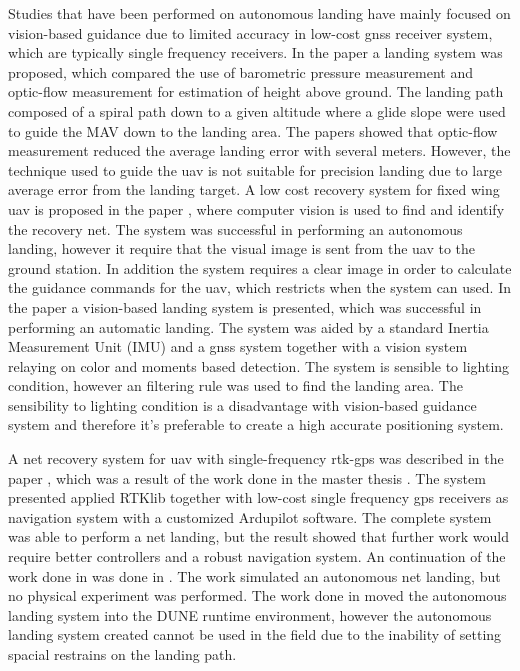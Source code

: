 Studies that have been performed on autonomous landing have mainly focused on vision-based guidance due to limited accuracy in low-cost \gls{gnss} receiver system, which are typically single frequency receivers. In the paper \citep{barber2007autonomous} a landing system was proposed, which compared the use of barometric pressure measurement and optic-flow measurement for estimation of height above ground. The landing path composed of a spiral path down to a given altitude where a glide slope were used to guide the MAV down to the landing area. The papers showed that optic-flow measurement reduced the average landing error with several meters. However, the technique used to guide the \gls{uav} is not suitable for precision landing due to large average error from the landing target. A low cost recovery system for fixed wing \gls{uav} is proposed in the paper \citep{kim2013fully}, where computer vision is used to find and identify the recovery net. The system was successful in performing an autonomous landing, however it require that the visual image is sent from the \gls{uav} to the ground station. In addition the system requires a clear image in order to calculate the guidance commands for the \gls{uav}, which restricts when the system can used. In the paper \citep{huh2010vision} a vision-based landing system is presented, which was successful in performing an automatic landing. The system was aided by a standard Inertia Measurement Unit (IMU) and a \gls{gnss} system together with a vision system relaying on color and moments based detection. The system is sensible to lighting condition, however an filtering rule was used to find the landing area. The sensibility to lighting condition is a disadvantage with vision-based guidance system and therefore it's preferable to create a high accurate positioning system.

A net recovery system for \gls{uav} with single-frequency \gls{rtk-gps} was described in the paper \citep{skulstad2015net}, which was a result of the work done in the master thesis \citep{Skulstad&Syversen}. The system presented applied RTKlib together with low-cost single frequency \gls{gps} receivers as navigation system with a customized Ardupilot software. The complete system was able to perform a net landing, but the result showed that further work would require better controllers and a robust navigation system. An continuation of the work done in \citep{Skulstad&Syversen} was done in \citep{Froelich}. The work simulated an autonomous net landing, but no physical experiment was performed. The work done in \citep{Froelich} moved the autonomous landing system into the DUNE runtime environment, however the autonomous landing system created cannot be used in the field due to the inability of setting spacial restrains on the landing path.

